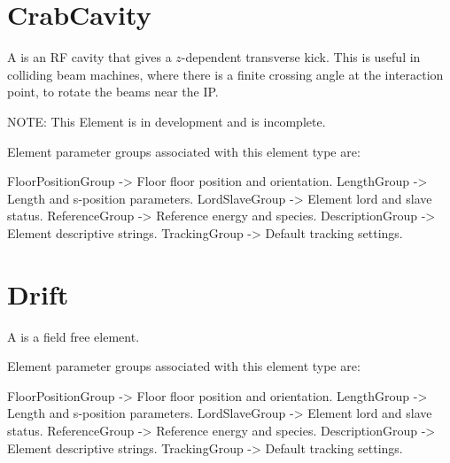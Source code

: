 \section{CrabCavity}
\label{s:crabcavity}

A  is an RF cavity that gives a $z$-dependent transverse kick. 
This is useful in colliding beam machines, where there is a finite crossing angle at the 
interaction point, to rotate the beams near the IP.

NOTE: This Element is in development and is incomplete.

Element parameter groups associated with this element type are:
\TOPrule
\begin{example}
  FloorPositionGroup -> Floor floor position and orientation.  
  LengthGroup        -> Length and s-position parameters.  
  LordSlaveGroup     -> Element lord and slave status.  
  ReferenceGroup     -> Reference energy and species.  
  DescriptionGroup   -> Element descriptive strings.  
  TrackingGroup      -> Default tracking settings.  
\end{example}
\BOTTOMrule


\section{Drift}
\label{s:drift}

A  is a field free element.

Element parameter groups associated with this element type are:
\TOPrule
\begin{example}
  FloorPositionGroup -> Floor floor position and orientation.  
  LengthGroup        -> Length and s-position parameters.  
  LordSlaveGroup     -> Element lord and slave status.  
  ReferenceGroup     -> Reference energy and species.  
  DescriptionGroup   -> Element descriptive strings.  
  TrackingGroup      -> Default tracking settings.  
\end{example}
\BOTTOMrule

